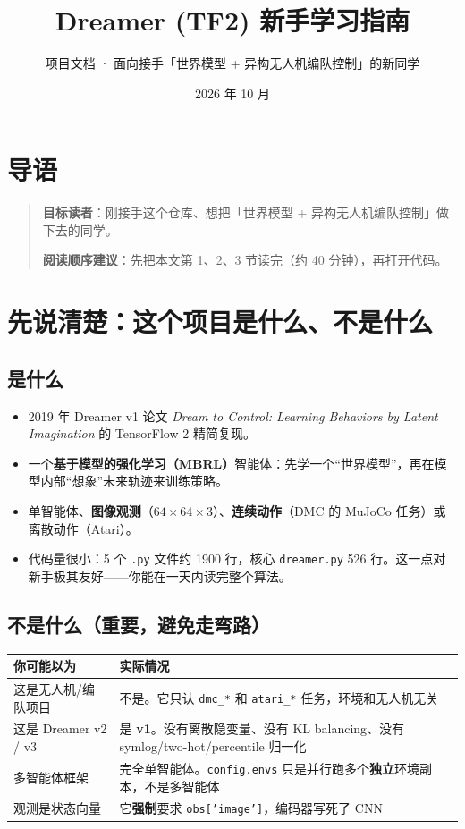 \documentclass[11pt]{ctexart}
\title{\textbf{Dreamer (TF2) 新手学习指南}}
\author{项目文档 · 面向接手「世界模型 + 异构无人机编队控制」的新同学}
\date{2026 年 10 月}
\begin{document}
\maketitle
\tableofcontents
\newpage

\section*{导语}
\begin{quote}
\textbf{目标读者}：刚接手这个仓库、想把「世界模型 + 异构无人机编队控制」做下去的同学。

\textbf{阅读顺序建议}：先把本文第 1、2、3 节读完（约 40 分钟），再打开代码。
\end{quote}

\section{先说清楚：这个项目是什么、不是什么}

\subsection{是什么}
\begin{itemize}
  \item 2019 年 Dreamer v1 论文 \emph{Dream to Control: Learning Behaviors by Latent Imagination} 的 TensorFlow 2 精简复现。
  \item 一个\textbf{基于模型的强化学习（MBRL）}智能体：先学一个``世界模型''，再在模型内部``想象''未来轨迹来训练策略。
  \item 单智能体、\textbf{图像观测}（$64\times64\times3$）、\textbf{连续动作}（DMC 的 MuJoCo 任务）或离散动作（Atari）。
  \item 代码量很小：5 个 \texttt{.py} 文件约 1900 行，核心 \texttt{dreamer.py} 526 行。这一点对新手极其友好——你能在一天内读完整个算法。
\end{itemize}

\subsection{不是什么（重要，避免走弯路）}
\begin{tabularx}{\textwidth}{L L}
\toprule
\textbf{你可能以为} & \textbf{实际情况} \\
\midrule
这是无人机/编队项目 & 不是。它只认 \texttt{dmc\_*} 和 \texttt{atari\_*} 任务，环境和无人机无关 \\
\addlinespace
这是 Dreamer v2 / v3 & 是 \textbf{v1}。没有离散隐变量、没有 KL balancing、没有 symlog/two-hot/percentile 归一化 \\
\addlinespace
多智能体框架 & 完全单智能体。\texttt{config.envs} 只是并行跑多个\textbf{独立}环境副本，不是多智能体 \\
\addlinespace
观测是状态向量 & 它\textbf{强制}要求 \texttt{obs['image']}，编码器写死了 CNN \\
\bottomrule
\end{tabularx}
\end{document}
